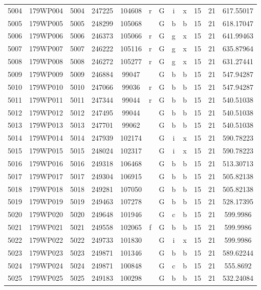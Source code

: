\begin{tabular}{|*{12}{c|}}
5004 & 179WP004 & 5004 & 247225 & 104608 & r & G & i & x & 15 & 21 & 617.55017 \\ 
5005 & 179WP005 & 5005 & 248299 & 105068 &  & G & b & b & 15 & 21 & 618.17047 \\ 
5006 & 179WP006 & 5006 & 246373 & 105066 & r & G & g & x & 15 & 21 & 641.99463 \\ 
5007 & 179WP007 & 5007 & 246222 & 105116 & r & G & g & x & 15 & 21 & 635.87964 \\ 
5008 & 179WP008 & 5008 & 246272 & 105277 & r & G & g & x & 15 & 21 & 631.27441 \\ 
5009 & 179WP009 & 5009 & 246884 & 99047 &  & G & b & b & 15 & 21 & 547.94287 \\ 
5010 & 179WP010 & 5010 & 247066 & 99036 & r & G & b & b & 15 & 21 & 547.94287 \\ 
5011 & 179WP011 & 5011 & 247344 & 99044 & r & G & b & b & 15 & 21 & 540.51038 \\ 
5012 & 179WP012 & 5012 & 247495 & 99044 &  & G & b & b & 15 & 21 & 540.51038 \\ 
5013 & 179WP013 & 5013 & 247701 & 99062 &  & G & b & b & 15 & 21 & 540.51038 \\ 
5014 & 179WP014 & 5014 & 247939 & 102174 &  & G & i & x & 15 & 21 & 590.78223 \\ 
5015 & 179WP015 & 5015 & 248024 & 102317 &  & G & i & x & 15 & 21 & 590.78223 \\ 
5016 & 179WP016 & 5016 & 249318 & 106468 &  & G & b & b & 15 & 21 & 513.30713 \\ 
5017 & 179WP017 & 5017 & 249304 & 106915 &  & G & b & b & 15 & 21 & 505.82138 \\ 
5018 & 179WP018 & 5018 & 249281 & 107050 &  & G & b & b & 15 & 21 & 505.82138 \\ 
5019 & 179WP019 & 5019 & 249463 & 107278 &  & G & b & b & 15 & 21 & 528.17395 \\ 
5020 & 179WP020 & 5020 & 249648 & 101946 &  & G & c & b & 15 & 21 & 599.9986 \\ 
5021 & 179WP021 & 5021 & 249558 & 102065 & f & G & b & b & 15 & 21 & 599.9986 \\ 
5022 & 179WP022 & 5022 & 249733 & 101830 &  & G & i & x & 15 & 21 & 599.9986 \\ 
5023 & 179WP023 & 5023 & 249871 & 101346 &  & G & b & b & 15 & 21 & 589.62244 \\ 
5024 & 179WP024 & 5024 & 249871 & 100848 &  & G & c & b & 15 & 21 & 555.8692 \\ 
5025 & 179WP025 & 5025 & 249183 & 100298 &  & G & b & b & 15 & 21 & 532.24084 \\ 

\end{tabular}
